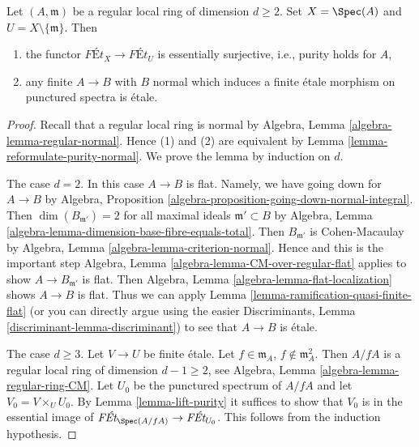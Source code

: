 \begin{lemma}
\label{lemma-local-purity}
Let $(A, \mathfrak m)$ be a regular local ring of dimension $d \geq 2$.
Set $X = \Spec(A)$ and $U = X \setminus \{\mathfrak m\}$. Then
\begin{enumerate}
\item the functor $\textit{F\'Et}_X \to \textit{F\'Et}_U$
is essentially surjective, i.e., purity holds for $A$,
\item any finite $A \to B$ with $B$ normal which
induces a finite \'etale morphism on punctured spectra is \'etale.
\end{enumerate}
\end{lemma}

\begin{proof}
Recall that a regular local ring is normal by
Algebra, Lemma \ref{algebra-lemma-regular-normal}.
Hence (1) and (2) are equivalent by
Lemma \ref{lemma-reformulate-purity-normal}.
We prove the lemma by induction on $d$.

\medskip\noindent
The case $d = 2$. In this case $A \to B$ is flat.
Namely, we have going down for $A \to B$ by
Algebra, Proposition \ref{algebra-proposition-going-down-normal-integral}.
Then $\dim(B_{\mathfrak m'}) = 2$ for all maximal ideals
$\mathfrak m' \subset B$ by
Algebra, Lemma \ref{algebra-lemma-dimension-base-fibre-equals-total}.
Then $B_{\mathfrak m'}$ is Cohen-Macaulay by
Algebra, Lemma \ref{algebra-lemma-criterion-normal}.
Hence and this is the important step
Algebra, Lemma \ref{algebra-lemma-CM-over-regular-flat}
applies to show $A \to B_{\mathfrak m'}$ is flat.
Then Algebra, Lemma \ref{algebra-lemma-flat-localization}
shows $A \to B$ is flat. Thus we can apply
Lemma \ref{lemma-ramification-quasi-finite-flat}
(or you can directly argue using the easier
Discriminants, Lemma \ref{discriminant-lemma-discriminant})
to see that $A \to B$ is \'etale.

\medskip\noindent
The case $d \geq 3$. Let $V \to U$ be finite \'etale.
Let $f \in \mathfrak m_A$, $f \not \in \mathfrak m_A^2$.
Then $A/fA$ is a regular local ring of dimension $d - 1 \geq 2$, see
Algebra, Lemma \ref{algebra-lemma-regular-ring-CM}.
Let $U_0$ be the punctured spectrum of $A/fA$ and let
$V_0 = V \times_U U_0$.
By Lemma \ref{lemma-lift-purity}
it suffices to show that $V_0$ is in the essential
image of $\textit{F\'Et}_{\Spec(A/fA)} \to \textit{F\'Et}_{U_0}$.
This follows from the induction hypothesis.
\end{proof}